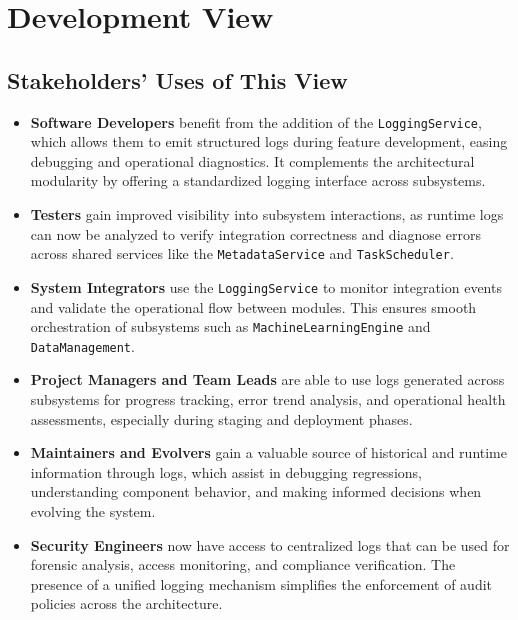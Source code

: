 \section{Development View}

\subsection{Stakeholders’ Uses of This View}

\begin{itemize}
  \item \textbf{Software Developers} benefit from the addition of the \texttt{LoggingService}, which allows them to emit structured logs during feature development, easing debugging and operational diagnostics. It complements the architectural modularity by offering a standardized logging interface across subsystems.

  \item \textbf{Testers} gain improved visibility into subsystem interactions, as runtime logs can now be analyzed to verify integration correctness and diagnose errors across shared services like the \texttt{MetadataService} and \texttt{TaskScheduler}.

  \item \textbf{System Integrators} use the \texttt{LoggingService} to monitor integration events and validate the operational flow between modules. This ensures smooth orchestration of subsystems such as \texttt{MachineLearningEngine} and \texttt{DataManagement}.

  \item \textbf{Project Managers and Team Leads} are able to use logs generated across subsystems for progress tracking, error trend analysis, and operational health assessments, especially during staging and deployment phases.

  \item \textbf{Maintainers and Evolvers} gain a valuable source of historical and runtime information through logs, which assist in debugging regressions, understanding component behavior, and making informed decisions when evolving the system.

  \item \textbf{Security Engineers} now have access to centralized logs that can be used for forensic analysis, access monitoring, and compliance verification. The presence of a unified logging mechanism simplifies the enforcement of audit policies across the architecture.
\end{itemize}

